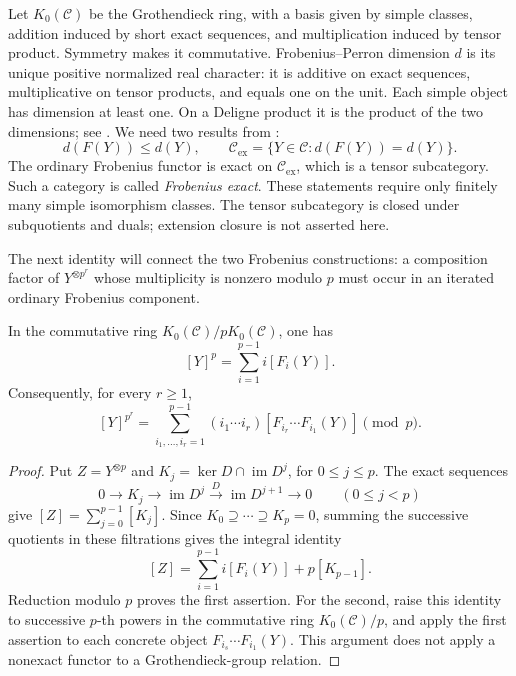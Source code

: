 Let $K_0(\mathcal C)$ be the Grothendieck ring, with a basis given by
simple classes, addition induced by short exact sequences, and
multiplication induced by tensor product. Symmetry makes it commutative.
Frobenius--Perron dimension $d$ is its unique positive normalized real
character: it is additive on exact sequences, multiplicative on tensor
products, and equals one on the unit. Each simple object has dimension
at least one. On a Deligne product it is the product of the two dimensions;
see \cite[Sections~3.3 and~4.5]{EGNO2015}. We need two results from
\cite[Propositions~6.3 and~7.4]{EtingofOstrikFrobenius}:
\begin{equation}\label{eq:ordinary-dimension}
 d(F(Y))\leq d(Y),\qquad
 \mathcal C_{\mathrm{ex}}=
 \{Y\in\mathcal C:d(F(Y))=d(Y)\}.
\end{equation}
The ordinary Frobenius functor is exact on $\mathcal C_{\mathrm{ex}}$,
which is a tensor subcategory. Such a category is called
\emph{Frobenius exact}. These statements require only finitely many
simple isomorphism classes.
The tensor subcategory is closed under subquotients and duals; extension
closure is not asserted here.

The next identity will connect the two Frobenius constructions: a
composition factor of \(Y^{\otimes p^r}\) whose multiplicity is nonzero
modulo \(p\) must occur in an iterated ordinary Frobenius component.

\begin{lemma}\label{lem:ordinary-congruence}
In the commutative ring \(K_0(\mathcal C)/pK_0(\mathcal C)\), one has
\[
 [Y]^p=\sum_{i=1}^{p-1}i[F_i(Y)].
\]
Consequently, for every \(r\geq1\),
\begin{equation}\label{eq:iterated-ordinary-congruence}
 [Y]^{p^r}
 =\sum_{i_1,\ldots,i_r=1}^{p-1}
    (i_1\cdots i_r)
    [F_{i_r}\cdots F_{i_1}(Y)]
 \pmod p.
\end{equation}
\end{lemma}

\begin{proof}
Put \(Z=Y^{\otimes p}\) and
\(K_j=\ker D\cap\operatorname{im}D^j\), for \(0\leq j\leq p\).
The exact sequences
\[
 0\longrightarrow K_j\longrightarrow\operatorname{im}D^j
 \xrightarrow{D}\operatorname{im}D^{j+1}\longrightarrow0
 \qquad(0\leq j<p)
\]
give \([Z]=\sum_{j=0}^{p-1}[K_j]\).
Since \(K_0\supseteq\cdots\supseteq K_p=0\), summing the successive
quotients in these filtrations gives the integral identity
\[
 [Z]=\sum_{i=1}^{p-1}i[F_i(Y)]+p[K_{p-1}].
\]
Reduction modulo \(p\) proves the first assertion.
For the second, raise this identity to successive \(p\)-th powers in
the commutative ring \(K_0(\mathcal C)/p\), and apply the first assertion
to each concrete object \(F_{i_s}\cdots F_{i_1}(Y)\).  This argument
does not apply a nonexact functor to a Grothendieck-group relation.
\end{proof}


